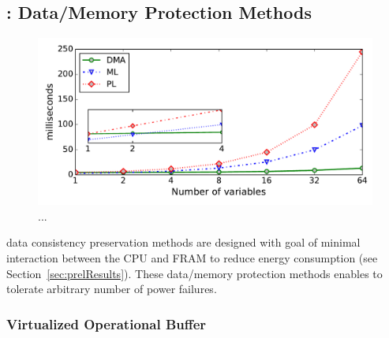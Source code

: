 
\subsection{\sys: Data/Memory Protection Methods}

\begin{figure}[t]
	\centering
	\includegraphics[width=0.8\columnwidth]{figures/iposCommitSize}
	\caption{...}
	\label{fig:virtOperationalBuf}
\end{figure}


\sys data consistency preservation methods are designed with goal of minimal interaction between the CPU and FRAM to reduce energy consumption (see Section~\ref{sec:prelResults}). These data/memory protection methods enables \sys to tolerate arbitrary number of power failures. 

	\subsubsection{Virtualized Operational Buffer}


